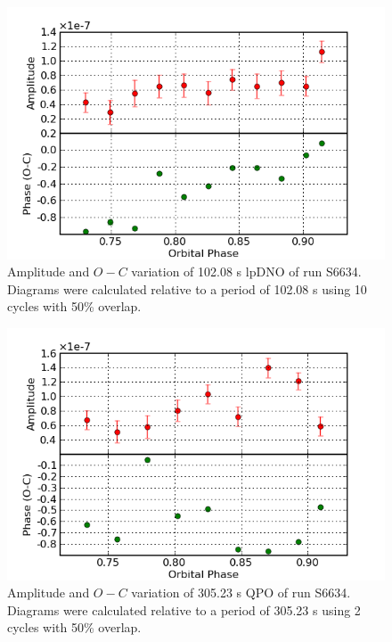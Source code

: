 \begin{figure}
 \centering
 \includegraphics[bb=0 0 600 400,width=0.85\columnwidth]{images/archive_phot/S6634/S6634d_102.08.png}
 \caption[S6634 $O-C$ diagram of 102.08 s lpDNO]{Amplitude and $O-C$ variation of 102.08 s lpDNO of run S6634. Diagrams were calculated relative to a period of 102.08 s using 10 cycles with 50\% overlap. }
 \label{S6634_102.08}
\end{figure}

\begin{figure}
 \centering
 \includegraphics[bb=0 0 600 400,width=0.85\columnwidth]{images/archive_phot/S6634/S6634d_305.23.png}
 \caption[S6634 $O-C$ diagram of 305.23 s QPO]{Amplitude and $O-C$ variation of 305.23 s QPO of run S6634. Diagrams were calculated relative to a period of 305.23 s using 2 cycles with 50\% overlap. }
 \label{S6634_305.23}
\end{figure}




